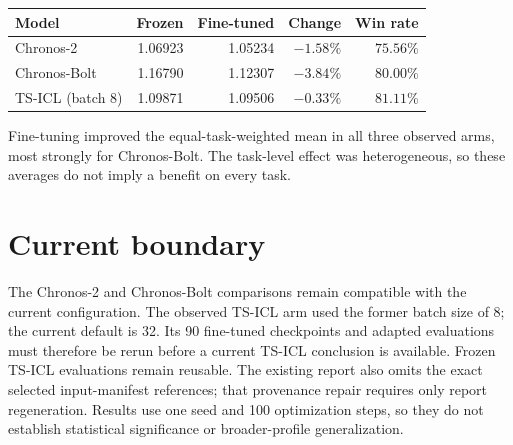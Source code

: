 \documentclass[10pt,a4paper]{article}
\begin{document}
\begin{table}[h]
\centering
\begin{tabular}{@{}lrrrr@{}}
\toprule
Model & Frozen & Fine-tuned & Change & Win rate \\
\midrule
Chronos-2 & 1.06923 & 1.05234 & $-1.58\%$ & $75.56\%$ \\
Chronos-Bolt & 1.16790 & 1.12307 & $-3.84\%$ & $80.00\%$ \\
TS-ICL (batch 8) & 1.09871 & 1.09506 & $-0.33\%$ & $81.11\%$ \\
\bottomrule
\end{tabular}
\end{table}

Fine-tuning improved the equal-task-weighted mean in all three observed arms,
most strongly for Chronos-Bolt. The task-level effect was heterogeneous, so
these averages do not imply a benefit on every task.

\section*{Current boundary}
The Chronos-2 and Chronos-Bolt comparisons remain compatible with the current
configuration. The observed TS-ICL arm used the former batch size of 8; the
current default is 32. Its 90 fine-tuned checkpoints and adapted evaluations
must therefore be rerun before a current TS-ICL conclusion is available.
Frozen TS-ICL evaluations remain reusable. The existing report also omits the
exact selected input-manifest references; that provenance repair requires only
report regeneration. Results use one seed and 100 optimization steps, so they
do not establish statistical significance or broader-profile generalization.
\end{document}
